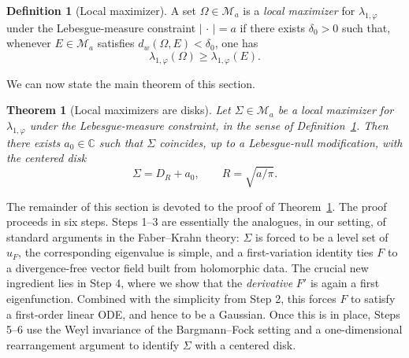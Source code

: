 \documentclass[a4paper,11pt,reqno]{amsart}
\numberwithin{equation}{section}
\theoremstyle{plain} %
\newtheorem{theorem}{Theorem}
\theoremstyle{definition} %
\newtheorem{definition}{Definition}[section]
\theoremstyle{remark}
\newcommand{\C}{\mathbb{C}}
\begin{document}
\begin{definition}[Local maximizer]\label{def:local-maximizer}
A set \(\Omega\in\mathcal M_a\) is a \emph{local maximizer} for
\(\lambda_{1,\varphi}\) under the Lebesgue-measure constraint
\(|\,\cdot\,|=a\) if there exists \(\delta_0>0\) such that, whenever
\(E\in \mathcal M_a\) satisfies \(d_w(\Omega,E)<\delta_0\), one has
\begin{equation}\label{eq:local-max-ineq}
\lambda_{1,\varphi}(\Omega)\ge \lambda_{1,\varphi}(E).
\end{equation}
\end{definition}

We can now state the main theorem of this section.

\begin{theorem}[Local maximizers are disks]\label{thm:local-max}
Let \(\Sigma\in\mathcal M_a\) be a local maximizer for \(\lambda_{1,\varphi}\)
under the Lebesgue-measure constraint, in the sense of
Definition~\ref{def:local-maximizer}. Then there exists \(a_0\in\C\) such that
\(\Sigma\) coincides, up to a Lebesgue-null modification, with the centered
disk
\[
\Sigma=D_R+a_0,\qquad R=\sqrt{a/\pi}.
\]
\end{theorem}

The remainder of this section is devoted to the proof of
Theorem~\ref{thm:local-max}. The
proof proceeds in six steps. Steps 1--3 are essentially the analogues, in our
setting, of standard arguments in the Faber--Krahn theory: \(\Sigma\) is forced
to be a level set of \(u_F\), the corresponding eigenvalue is simple, and a
first-variation identity ties \(F\) to a divergence-free vector field built from
holomorphic data. The crucial new ingredient lies in Step 4, where we show that
the \emph{derivative} \(F'\) is again a first eigenfunction. Combined with the
simplicity from Step 2, this forces \(F\) to satisfy a first-order linear ODE,
and hence to be a Gaussian. Once this is in place, Steps 5--6 use the Weyl
invariance of the Bargmann--Fock setting and a one-dimensional rearrangement
argument to identify \(\Sigma\) with a centered disk.
\end{document}
